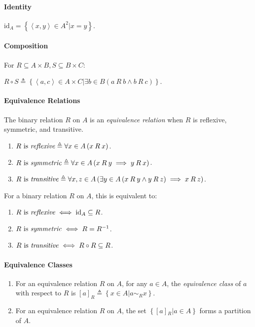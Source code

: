 \documentclass[10pt,twoside,twocolumn]{article}
\begin{document}
\paragraph{Identity}

$\mbox{id}_{A}=\left\{ \left\langle x,y\right\rangle \in A^{2}|x=y\right\} $.


\paragraph{Composition}

For $R\subseteq A\times B,S\subseteq B\times C$:

$R\circ S\triangleq\left\{ \left\langle a,c\right\rangle \in A\times C|\exists b\in B\left(a\:R\:b\land b\:R\:c\right)\right\} $.


\paragraph{Equivalence Relations}

The binary relation $R$ on $A$ is an \emph{equivalence relation}
when $R$ is reflexive, symmetric, and transitive.
\begin{enumerate}
\item $R\mbox{ is \emph{reflexive}}\triangleq\forall x\in A\left(x\:R\:x\right)$. 
\item $R\mbox{ is \emph{symmetric}}\triangleq\forall x\in A\left(x\:R\:y\implies y\:R\:x\right)$. 
\item $R\mbox{ is \emph{transitive}}\triangleq\forall x,z\in A\left(\exists y\in A\left(x\:R\:y\land y\:R\:z\right)\implies x\:R\:z\right)$. 
\end{enumerate}
For a binary relation $R$ on $A$, this is equivalent to: 
\begin{enumerate}
\item $R\mbox{ is \emph{reflexive}}\iff\mbox{id}_{A}\subseteq R$. 
\item $R\mbox{ is \emph{symmetric}}\iff R=R^{-1}$. 
\item $R\mbox{ is \emph{transitive}}\iff R\circ R\subseteq R$.
\end{enumerate}

\paragraph{Equivalence Classes}
\begin{enumerate}
\item For an equivalence relation $R$ on $A$, for any $a\in A$, the \emph{equivalence
class} of $a$ with respect to $R$ is $\left[a\right]_{R}\triangleq\left\{ x\in A|a\sim_{R}x\right\} $.
\item For an equivalence relation $R$ on $A$, the set $\left\{ \left[a\right]{}_{R}|a\in A\right\} $
forms a partition of $A$.
\end{enumerate}
\end{document}
